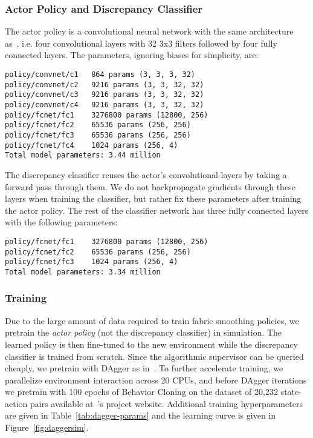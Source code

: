 \subsubsection{Actor Policy and Discrepancy Classifier}\label{ssec:actorpol}
The actor policy is a convolutional neural network with the same architecture as~\cite{seita_fabrics_2020}, i.e. four convolutional layers with 32 3x3 filters followed by four fully connected layers. The parameters, ignoring biases for simplicity, are:

\footnotesize
\begin{verbatim}
policy/convnet/c1   864 params (3, 3, 3, 32)
policy/convnet/c2   9216 params (3, 3, 32, 32)
policy/convnet/c3   9216 params (3, 3, 32, 32)
policy/convnet/c4   9216 params (3, 3, 32, 32)
policy/fcnet/fc1    3276800 params (12800, 256)
policy/fcnet/fc2    65536 params (256, 256)
policy/fcnet/fc3    65536 params (256, 256)
policy/fcnet/fc4    1024 params (256, 4)
Total model parameters: 3.44 million
\end{verbatim}
\normalsize

The discrepancy classifier reuses the actor's convolutional layers by taking a forward pass through them. We do not backpropagate gradients through these layers when training the classifier, but rather fix these parameters after training the actor policy. The rest of the classifier network has three fully connected layers with the following parameters:

\footnotesize
\begin{verbatim}
policy/fcnet/fc1    3276800 params (12800, 256)
policy/fcnet/fc2    65536 params (256, 256)
policy/fcnet/fc3    1024 params (256, 4)
Total model parameters: 3.34 million
\end{verbatim}
\normalsize

\subsubsection{Training}
Due to the large amount of data required to train fabric smoothing policies, we pretrain the \textit{actor policy} (not the discrepancy classifier) in simulation. The learned policy is then fine-tuned to the new environment while the discrepancy classifier is trained from scratch. Since the algorithmic supervisor can be queried cheaply, we pretrain with DAgger as in~\cite{seita_fabrics_2020}. To further accelerate training, we parallelize environment interaction across 20 CPUs, and before DAgger iterations we pretrain with 100 epochs of Behavior Cloning on the dataset of 20,232 state-action pairs available at~\cite{seita_fabrics_2020}'s project website. Additional training hyperparameters are given in Table~\ref{tab:dagger-params} and the learning curve is given in Figure~\ref{fig:daggersim}. 

